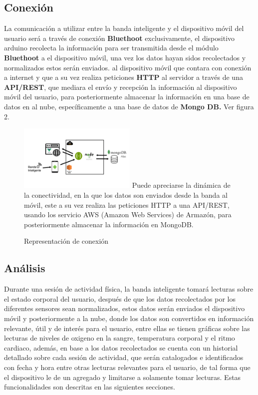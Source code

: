 \documentclass[osajnl,twocolumn,showpacs,superscriptaddress,10pt]{revtex4-1}
\begin{document}
\subsection{Conexión}
    La comunicación a utilizar entre la banda inteligente y el dispositivo móvil del usuario será a través de conexión \textbf{Bluethoot} exclusivamente, el dispositivo arduino recolecta la información para ser transmitida desde el módulo \textbf{Bluethoot} a el dispositivo móvil, una vez los datos hayan sidos recolectados y normalizados estos serán enviados.  al dispositivo móvil que contara con conexión a internet y que a su vez realiza peticiones \textbf{HTTP} al servidor a través de una \textbf{API/REST}, que mediara el envío y recepción la información al dispositivo móvil del usuario, para posteriormente almacenar la información en una base de datos en al nube, específicamente a una base de datos de \textbf{Mongo DB.} Ver figura 2. \newline
\begin{figure} [H] \centering 
\caption{Representación de conexión}
\includegraphics[width=0.5\textwidth]{Arquitectura.png} 
Puede apreciarse la dinámica de la conectividad, en la que los datos son enviados desde la banda al móvil, este a su vez realiza las peticiones HTTP a una API/REST, usando los servicio AWS (Amazon Web Services) de Armazón, para posteriormente almacenar la información en MongoDB.
\end{figure}

\subsection{Análisis}
    Durante una sesión de actividad física, la banda inteligente tomará lecturas sobre el estado corporal del usuario, después de que los datos recolectados por los diferentes sensores sean normalizados, estos datos serán enviados el dispositivo móvil y posteriormente a la nube, donde los datos son convertidos en información relevante, útil y de interés para el usuario, entre ellas se tienen gráficas sobre las lecturas de niveles de oxigeno en la sangre, temperatura corporal y el ritmo cardiaco, además, en base a los datos recolectados se cuenta con un historial detallado sobre cada sesión de actividad, que serán catalogados e identificados con fecha y hora entre otras lecturas relevantes para el usuario, de tal forma que el dispositivo le de un agregado y limitarse a solamente tomar lecturas. Estas funcionalidades son descritas en las siguientes secciones.
    
\end{document}
